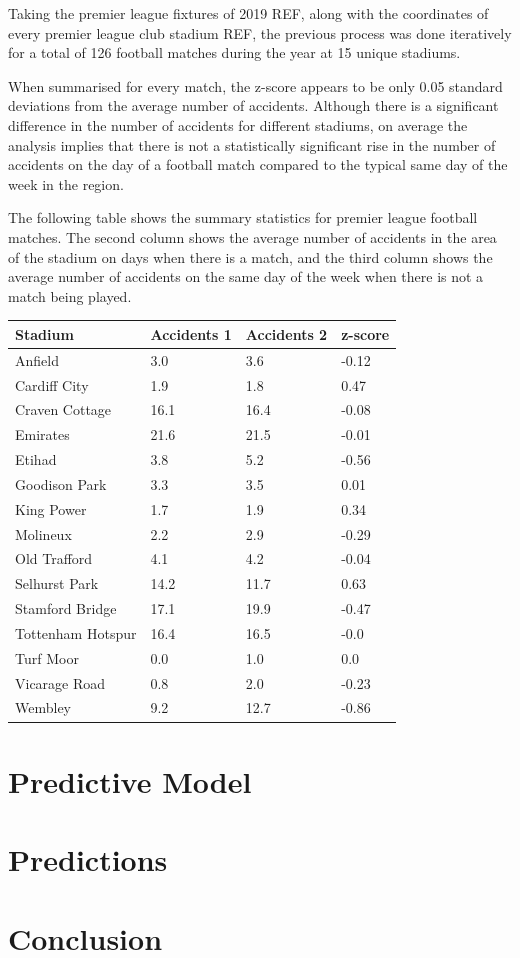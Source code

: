 \documentclass[12pt]{article}
\begin{document}
Taking the premier league fixtures of 2019 REF, along with the coordinates of every premier league club stadium REF, the previous process was done iteratively for a total of 126 football matches during the year at 15 unique stadiums.

When summarised for every match, the z-score appears to be only 0.05 standard deviations from the average number of accidents. Although there is a significant difference in the number of accidents for different stadiums, on average the analysis implies that there is not a statistically significant rise in the number of accidents on the day of a football match compared to the typical same day of the week in the region.

The following table shows the summary statistics for premier league football matches. The second column shows the average number of accidents in the area of the stadium on days when there is a match, and the third column shows the average number of accidents on the same day of the week when there is not a match being played.

\begin{table}[!ht]
    \centering
    \begin{tabular}{|l|l|l|l|}
    \hline
        Stadium & Accidents 1 & Accidents 2 & z-score \\ \hline
        Anfield & 3.0 & 3.6 & -0.12 \\ \hline
        Cardiff City & 1.9 & 1.8 & 0.47 \\ \hline
        Craven Cottage & 16.1 & 16.4 & -0.08 \\ \hline
        Emirates & 21.6 & 21.5 & -0.01 \\ \hline
        Etihad & 3.8 & 5.2 & -0.56 \\ \hline
        Goodison Park & 3.3 & 3.5 & 0.01 \\ \hline
        King Power & 1.7 & 1.9 & 0.34 \\ \hline
        Molineux & 2.2 & 2.9 & -0.29 \\ \hline
        Old Trafford & 4.1 & 4.2 & -0.04 \\ \hline
        Selhurst Park & 14.2 & 11.7 & 0.63 \\ \hline
        Stamford Bridge & 17.1 & 19.9 & -0.47 \\ \hline
        Tottenham Hotspur & 16.4 & 16.5 & -0.0 \\ \hline
        Turf Moor & 0.0 & 1.0 & 0.0 \\ \hline
        Vicarage Road & 0.8 & 2.0 & -0.23 \\ \hline
        Wembley & 9.2 & 12.7 & -0.86 \\ \hline
    \end{tabular}
\end{table}

\section{Predictive Model}


\section{Predictions}

\section{Conclusion}



\end{document}
